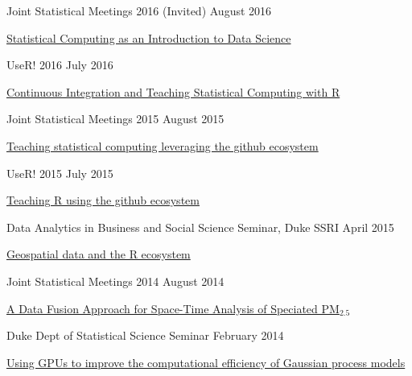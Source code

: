 \documentclass[margin,line]{res}
\begin{document}
\begin{resume}
Joint Statistical Meetings 2016 (Invited) \hfill August 2016
\begin{list1}
\item[] \href{https://github.com/rundel/Presentations/tree/master/JSM%202016}{Statistical Computing as an Introduction to Data Science}
\end{list1}
\vspace{-3mm}

UseR! 2016 \hfill July 2016
\begin{list1}
\item[] \href{https://github.com/rundel/Presentations/tree/master/UseR2016}{Continuous Integration and Teaching Statistical Computing with R}
\end{list1}
\vspace{-3mm}


Joint Statistical Meetings 2015 \hfill August 2015
\begin{list1}
\item[] \href{https://github.com/rundel/Presentations/tree/master/JSM%202015}{Teaching statistical computing leveraging the github ecosystem}
\end{list1}
\vspace{-3mm}

UseR! 2015 \hfill July 2015
\begin{list1}
\item[] \href{https://github.com/rundel/Presentations/tree/master/UseR2015}{Teaching R using the github ecosystem}
\end{list1}
\vspace{-3mm}


Data Analytics in Business and Social Science Seminar, Duke SSRI \hfill April 2015
\begin{list1}
\item[] \href{https://github.com/rundel/Presentations/tree/master/Duke%202015%20-%20DABSS}{Geospatial data and the R ecosystem}
\end{list1}
\vspace{-3mm}

Joint Statistical Meetings 2014 \hfill August 2014
\begin{list1}
\item[] \href{https://github.com/rundel/Presentations/tree/master/JSM%202014}{A Data Fusion Approach for Space-Time Analysis of Speciated PM$_{2.5}$}
\end{list1}
\vspace{-3mm}

Duke Dept of Statistical Science Seminar \hfill February 2014
\begin{list1}
\item[] \href{https://github.com/rundel/Presentations/tree/master/Duke%202014}{Using GPUs to improve the computational efficiency of Gaussian process models}
\end{list1}
\vspace{-3mm}



\end{resume}
\end{document}
